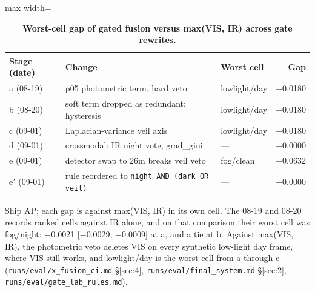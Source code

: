 \documentclass[10pt]{article}
\begin{document}
\begin{table}[htbp]
\centering
\small
\caption{\textbf{Worst-cell gap of gated fusion versus max(VIS, IR) across gate rewrites.}}
\label{tab:3a}
\begin{adjustbox}{max width=\linewidth}
\begin{tabular}{lllr}
\toprule
Stage (date) & Change & Worst cell & Gap \\
\midrule
a (08-19) & p05 photometric term, hard veto & lowlight/day & $-$0.0180 \\
b (08-20) & soft term dropped as redundant; hysteresis & lowlight/day & $-$0.0180 \\
c (09-01) & Laplacian-variance veil axis & lowlight/day & $-$0.0180 \\
d (09-01) & crossmodal: IR night vote, grad\_gini & --- & +0.0000 \\
e (09-01) & detector swap to 26m breaks veil veto & fog/clean & $-$0.0632 \\
e$'$ (09-01) & rule reordered to \texttt{night AND (dark OR veil)} & --- & +0.0000 \\
\bottomrule
\end{tabular}
\end{adjustbox}
\par\smallskip\raggedright\footnotesize Ship AP; each gap is against max(VIS, IR) in its own cell. The 08-19 and 08-20 records ranked cells against IR alone, and on that comparison their worst cell was fog/night: $-$0.0021 [$-$0.0029, $-$0.0009] at a, and a tie at b. Against max(VIS, IR), the photometric veto deletes VIS on every synthetic low-light day frame, where VIS still works, and lowlight/day is the worst cell from a through c (\texttt{runs/\allowbreak{}eval/\allowbreak{}x\_\allowbreak{}fusion\_\allowbreak{}ci.md} \S\ref{sec:4}, \texttt{runs/\allowbreak{}eval/\allowbreak{}final\_\allowbreak{}system.md} \S\ref{sec:2}, \texttt{runs/\allowbreak{}eval/\allowbreak{}gate\_\allowbreak{}lab\_\allowbreak{}rules.md}).
\end{table}
\end{document}
